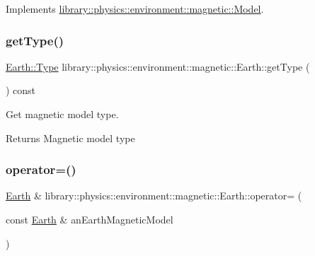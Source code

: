 Implements \hyperlink{classlibrary_1_1physics_1_1environment_1_1magnetic_1_1_model_aa15f7c2f01867c057481c2fabe645210}{library\+::physics\+::environment\+::magnetic\+::\+Model}.

\mbox{\label{classlibrary_1_1physics_1_1environment_1_1magnetic_1_1_earth_a0df623ebad4942ff9e3ab1ed7387e275}} 
\subsubsection{\texorpdfstring{get\+Type()}{getType()}}
{\footnotesize\ttfamily \hyperlink{classlibrary_1_1physics_1_1environment_1_1magnetic_1_1_earth_ab9d257d23aa5899a3ef36c7dec62ef72}{Earth\+::\+Type} library\+::physics\+::environment\+::magnetic\+::\+Earth\+::get\+Type (\begin{DoxyParamCaption}{ }\end{DoxyParamCaption}) const}



Get magnetic model type. 

\begin{DoxyReturn}{Returns}
Magnetic model type 
\end{DoxyReturn}
\mbox{\label{classlibrary_1_1physics_1_1environment_1_1magnetic_1_1_earth_a8db1f77519e511e1e92022c09c6eb052}} 
\subsubsection{\texorpdfstring{operator=()}{operator=()}}
{\footnotesize\ttfamily \hyperlink{classlibrary_1_1physics_1_1environment_1_1magnetic_1_1_earth}{Earth} \& library\+::physics\+::environment\+::magnetic\+::\+Earth\+::operator= (\begin{DoxyParamCaption}\item[{const \hyperlink{classlibrary_1_1physics_1_1environment_1_1magnetic_1_1_earth}{Earth} \&}]{an\+Earth\+Magnetic\+Model }\end{DoxyParamCaption})}



